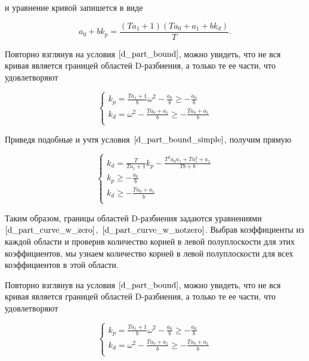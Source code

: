 \documentclass[a4paper]{article}
\begin{document}
и уравнение кривой запишется в виде

$$ a_0 + bk_p = \frac{(Ta_1+1)(Ta_0+a_1+bk_d)}{T}. $$

Повторно взглянув на условия $\eqref{d_part_bound}$, можно увидеть, что не вся кривая является границей областей D-разбиения, а только те ее части, что удовлетворяют

\begin{equation}
	\label{d_part_bound_simple}
	\begin{cases}
		k_p = \frac{Ta_1+1}{b}\omega^2 -\frac{a_0}{b} \ge -\frac{a_0}{b} \\
		k_d = \omega^2 -\frac{Ta_0+a_1}{b} \ge -\frac{Ta_0+a_1}{b} \\
	\end{cases}
\end{equation}

Приведя подобные и учтя условия~$\eqref{d_part_bound_simple}$, получим прямую

\begin{equation}
	\label{d_part_curve_w_notzero}
	\begin{cases}
		k_d = \frac{T}{Ta_1+1}k_p - \frac{T^2a_0a_1 + Ta_1^2+a_1}{Tb+b} \\
		k_p \ge -\frac{a_0}{b} \\
		k_d \ge -\frac{Ta_0+a_1}{b} \\
	\end{cases}
\end{equation}

Таким образом, границы областей D-разбиения задаются уравнениями~$\eqref{d_part_curve_w_zero}$,~$\eqref{d_part_curve_w_notzero}$. Выбрав коэффициенты из каждой области и проверив количество корней в левой полуплоскости для этих коэффициентов, мы узнаем количество корней в левой полуплоскости для всех коэффициентов в этой области.

Повторно взглянув на условия $\eqref{d_part_bound}$, можно увидеть, что не вся кривая является границей областей D-разбиения, а только те ее части, что удовлетворяют

\begin{equation}
	\label{d_part_bound_simple}
	\begin{cases}
		k_p = \frac{Ta_1+1}{b}\omega^2 -\frac{a_0}{b} \ge -\frac{a_0}{b} \\
		k_d = \omega^2 -\frac{Ta_0+a_1}{b} \ge -\frac{Ta_0+a_1}{b} \\
	\end{cases}
\end{equation}
\end{document}
